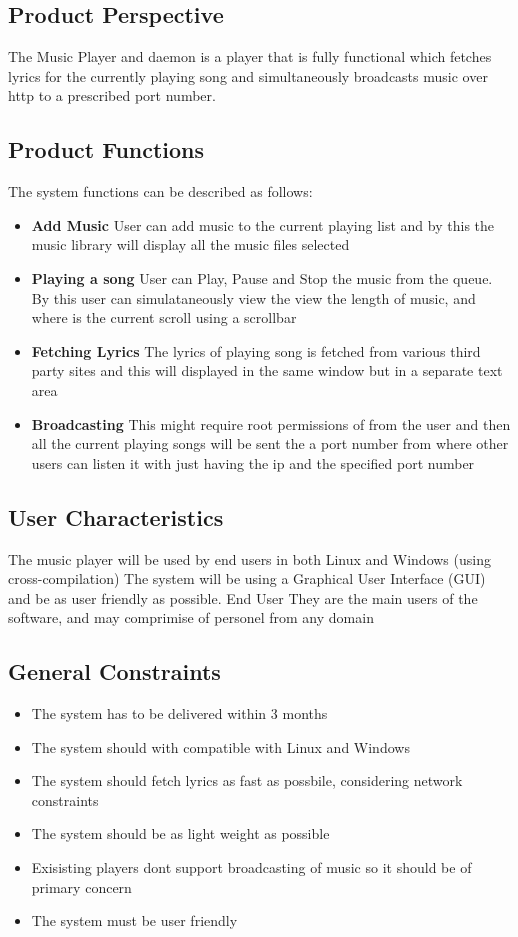 \subsection{Product Perspective}
The Music Player and daemon is a player that is fully functional which
fetches lyrics for the currently playing song and simultaneously broadcasts music
over http to a prescribed port number. 
\subsection{Product Functions}
The system functions can be described as follows:
\begin{itemize}
\item{\textbf{Add Music}}
User can add music to the current playing list and by this the music library will
display all the music files selected
\item{\textbf{Playing a song}}
User can Play, Pause and Stop the music from the queue. By this user can simulataneously 
view the view the length of music, and where is the current scroll using a scrollbar
\item{\textbf{Fetching Lyrics}}
The lyrics of playing song is fetched from various third party sites and this will displayed in 
the same window but in a separate text area
\item{\textbf{Broadcasting}}
This might require root permissions of from the user and then all the current playing songs
will be sent the a port number from where other users can listen it with just having the ip and the 
specified port number
\end{itemize}
\subsection{User Characteristics}
The music player will be used by end users in both Linux and Windows (using cross-compilation)
The system will be using a Graphical User Interface (GUI) and be as user friendly as possible.
\large{End User}
They are the main users of the software, and may comprimise of personel from any domain
\subsection{General Constraints}
\begin{itemize}
\item{The system has to be delivered within 3 months }
\item{The system should with compatible with Linux and Windows}
\item{The system should fetch lyrics as fast as possbile, considering network constraints}
\item{The system should be as light weight as possible}
\item{Exisisting players dont support broadcasting of music so it should be of primary concern}
\item{The system must be user friendly}
\end{itemize}
